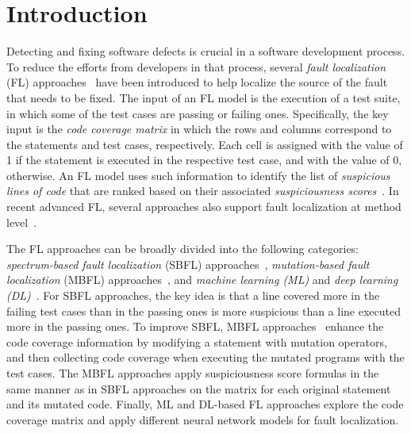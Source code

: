 \section{Introduction}

Detecting and fixing software defects is crucial in a software
development process.
To reduce the efforts from developers in that
process, several {\em fault localization} (FL)
approaches~\cite{fl-survey} have been introduced to help localize the
source of the fault that needs to be fixed. The input of an FL model
is the execution of a test suite, in which some of the test cases are
passing or failing ones. Specifically, the key input is the {\em code
  coverage matrix} in which the rows and columns correspond to the
statements and test cases, respectively.  Each cell is assigned with
the value of 1 if the statement is executed in the
respective test case, and with the value of 0, otherwise.  An FL model
uses such information to identify the list of {\em suspicious lines of
  code} that are ranked based on their associated {\em suspiciousness
  scores}~\cite{fl-survey}. In recent advanced FL, several approaches
also support fault localization at method
level~\cite{DeepFL,icse21-fl}.




The FL approaches can be broadly divided into the following
categories: {\em spectrum-based fault localization} (SBFL)
approaches~\cite{abreu2006evaluation,jones2001visualization,keller2017critical},
{\em mutation-based fault localization} (MBFL)
approaches~\cite{MUSE,papadakis2012using,Metallaxis}, and {\em machine
  learning (ML)} and {\em deep learning (DL)}~\cite{DeepFL,icse21-fl}.
For SBFL approaches, the key idea is that a line covered more in the
failing test cases than in the passing ones is more suspicious than a
line executed more in the passing ones.
%
To improve SBFL, MBFL
approaches~\cite{MUSE,papadakis2012using,Metallaxis} enhance the code
coverage information by modifying a statement with mutation operators,
and then collecting code coverage when executing the mutated programs
with the test cases. The MBFL approaches apply suspiciousness score
formulas in the same manner as in SBFL approaches on the matrix for
each original statement and its mutated code.
%
Finally, ML and DL-based FL approaches explore the code coverage
matrix and apply different neural network models for fault
localization.


